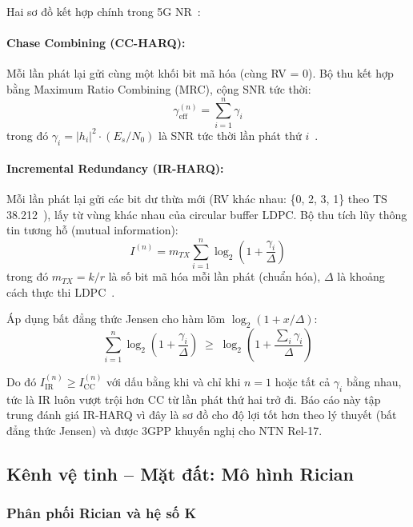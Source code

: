 Hai sơ đồ kết hợp chính trong 5G NR~\cite{ts38212}:

\paragraph{Chase Combining (CC-HARQ):} Mỗi lần phát lại gửi cùng một khối bit mã hóa (cùng RV = 0). Bộ thu kết hợp bằng Maximum Ratio Combining (MRC), cộng SNR tức thời:
\begin{equation}\label{eq:cc_snr}
    \gamma_{\text{eff}}^{(n)} = \sum_{i=1}^{n} \gamma_i
\end{equation}
trong đó $\gamma_i = |h_i|^2 \cdot (E_s/N_0)$ là SNR tức thời lần phát thứ $i$~\cite{chase1985}.

\paragraph{Incremental Redundancy (IR-HARQ):} Mỗi lần phát lại gửi các bit dư thừa mới (RV khác nhau: \{0, 2, 3, 1\} theo TS 38.212~\cite{ts38212}), lấy từ vùng khác nhau của circular buffer LDPC. Bộ thu tích lũy thông tin tương hỗ (mutual information):
\begin{equation}\label{eq:ir_mi}
    I^{(n)} = m_{TX} \sum_{i=1}^{n} \log_2\!\left(1 + \frac{\gamma_i}{\Delta}\right)
\end{equation}
trong đó $m_{TX} = k/r$ là số bit mã hóa mỗi lần phát (chuẩn hóa), $\Delta$ là khoảng cách thực thi LDPC~\cite{hagenauer1988}.

Áp dụng bất đẳng thức Jensen cho hàm lõm $\log_2(1 + x/\Delta)$:
\begin{equation}\label{eq:jensen}
    \sum_{i=1}^{n} \log_2\!\left(1 + \frac{\gamma_i}{\Delta}\right) \;\geq\; \log_2\!\left(1 + \frac{\sum_i \gamma_i}{\Delta}\right)
\end{equation}

Do đó $I_{\text{IR}}^{(n)} \geq I_{\text{CC}}^{(n)}$ với dấu bằng khi và chỉ khi $n = 1$ hoặc tất cả $\gamma_i$ bằng nhau, tức là IR luôn vượt trội hơn CC từ lần phát thứ hai trở đi. Báo cáo này tập trung đánh giá IR-HARQ vì đây là sơ đồ cho độ lợi tốt hơn theo lý thuyết (bất đẳng thức Jensen) và được 3GPP khuyến nghị cho NTN Rel-17.

\subsection{Kênh vệ tinh -- Mặt đất: Mô hình Rician}

\subsubsection{Phân phối Rician và hệ số K}


